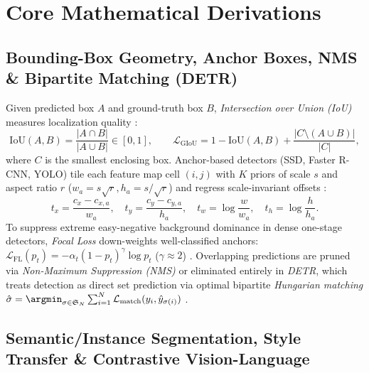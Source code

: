 \documentclass[../../../../master.tex]{subfiles}
\begin{document}
\section{Core Mathematical Derivations}

\subsection{Bounding-Box Geometry, Anchor Boxes, NMS \& Bipartite Matching (DETR)}

\begin{coremath}
Given predicted box $A$ and ground-truth box $B$, \emph{Intersection over Union (IoU)} measures localization quality :
\begin{equation}
  \mathrm{IoU}(A, B) = \frac{|A \cap B|}{|A \cup B|} \in [0, 1], \qquad \mathcal{L}_{\mathrm{GIoU}} = 1 - \mathrm{IoU}(A,B) + \frac{|C \setminus (A \cup B)|}{|C|},
\end{equation}
where $C$ is the smallest enclosing box. Anchor-based detectors (SSD, Faster R-CNN, YOLO) tile each feature map cell $(i,j)$ with $K$ priors of scale $s$ and aspect ratio $r$ ($w_a = s\sqrt{r}, h_a = s/\sqrt{r}$) and regress scale-invariant offsets :
\begin{equation}
  t_x = \frac{c_x - c_{x,a}}{w_a}, \quad t_y = \frac{c_y - c_{y,a}}{h_a}, \quad t_w = \log\frac{w}{w_a}, \quad t_h = \log\frac{h}{h_a}.
\end{equation}
To suppress extreme easy-negative background dominance in dense one-stage detectors, \emph{Focal Loss} down-weights well-classified anchors: $\mathcal{L}_{\mathrm{FL}}(p_t) = -\alpha_t (1-p_t)^\gamma \log p_t$ ($\gamma \approx 2$) . Overlapping predictions are pruned via \emph{Non-Maximum Suppression (NMS)} or eliminated entirely in \emph{DETR}, which treats detection as direct set prediction via optimal bipartite \emph{Hungarian matching} $\hat{\sigma} = \argmin_{\sigma \in \mathfrak{S}_N} \sum_{i=1}^N \mathcal{L}_{\mathrm{match}}(y_i, \hat{y}_{\sigma(i)})$ .
\end{coremath}

\subsection{Semantic/Instance Segmentation, Style Transfer \& Contrastive Vision-Language}
\end{document}
